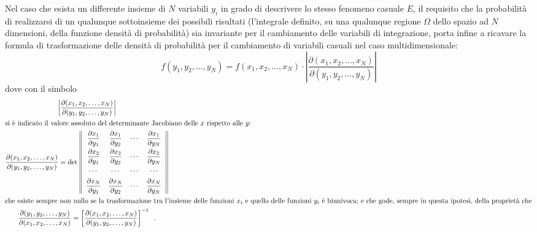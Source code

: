%
Nel caso che esista un differente insieme di $N$ variabili
$y_i$ in grado di descrivere lo stesso fenomeno casuale $E$,
il requisito che la probabilit\`a di realizzarsi di un
qualunque sottoinsieme dei possibili risultati (l'integrale
definito, su una qualunque regione $\Omega$ dello spazio ad
$N$ dimensioni, della funzione densit\`a di probabilit\`a)
sia invariante per il cambiamento delle variabili di
integrazione, porta infine a ricavare la formula di
trasformazione delle densit\`a di probabilit\`a per il
cambiamento di variabili casuali nel caso multidimensionale:
\begin{equation} \label{eq:6.cavamu}
  f(y_1, y_2,\ldots ,y_N) = f(x_1, x_2,\ldots, x_N)
    \cdot \left| \frac{\partial (x_1, x_2,\ldots
    ,x_N)}{\partial (y_1, y_2,\ldots ,y_N)} \right|
\end{equation}
dove con il simbolo
\begin{gather*}
  \left| \frac{\partial (x_1, x_2,\ldots
    ,x_N)}{\partial (y_1, y_2,\ldots ,y_N)} \right| \\
  \intertext{si \`e indicato il valore assoluto del
    determinante Jacobiano%
    \index{Jacobiano, determinante|emidx}
    delle $x$ rispetto alle $y$:}
  \frac{\partial (x_1, x_2,\ldots
    ,x_N)}{\partial (y_1, y_2,\ldots ,y_N)} =
    \det \left\|
      \begin{array}{cccc}
        \dfrac{\partial x_1}{\partial y_1} &
          \dfrac{\partial x_1}{\partial y_2} & \cdots &
          \dfrac{\partial x_1}{\partial y_N} \\[2ex]
        \dfrac{\partial x_2}{\partial y_1} &
          \dfrac{\partial x_2}{\partial y_2} & \cdots &
          \dfrac{\partial x_2}{\partial y_N} \\[2ex]
        \cdots & \cdots & \cdots & \cdots \\[1ex]
        \dfrac{\partial x_N}{\partial y_1} &
          \dfrac{\partial x_N}{\partial y_2} & \cdots &
          \dfrac{\partial x_N}{\partial y_N}
      \end{array}
    \right\| \\
  \intertext{che esiste sempre non nullo se la
    trasformazione tra l'insieme delle funzioni $x_i$ e
    quello delle funzioni $y_i$ \`e biunivoca; e che
    gode, sempre in questa ipotesi, della propriet\`a che}
  \frac{\partial (y_1, y_2,\ldots
    ,y_N)}{\partial (x_1, x_2,\ldots ,x_N)} =
    \left[ \frac{\partial (x_1, x_2,\ldots
    ,x_N)}{\partial (y_1, y_2,\ldots ,y_N)} \right]^{-1} \peq
    .
\end{gather*}%

\endinput
